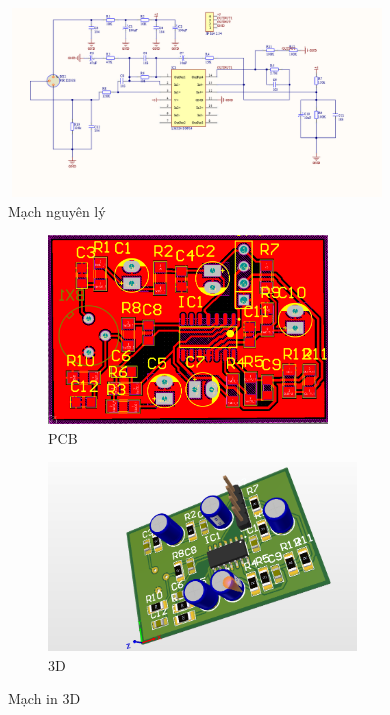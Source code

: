\documentclass{article}
\begin{document}
\begin{figure}[H]
    \centering
    \includegraphics[width=10cm,height=5cm]{image/anh6.png}
    \caption{Mạch nguyên lý} \label{EV}
\end{figure}

\begin{figure}[H]
    \centering
    \begin{subfigure}[b]{0.45\textwidth}
        \centering
        \includegraphics[width=\textwidth,height=5cm]{image/anh7.png}
        \caption{PCB} \label{EV1}
    \end{subfigure}
    \hfill
    \begin{subfigure}[b]{0.45\textwidth}
        \centering
        \includegraphics[width=\textwidth,height=5cm]{image/anh8.png}
        \caption{3D} \label{EV2}
    \end{subfigure}
    \caption{Mạch in 3D}
    \label{fig:two_graphs}
\end{figure}
\end{document}
